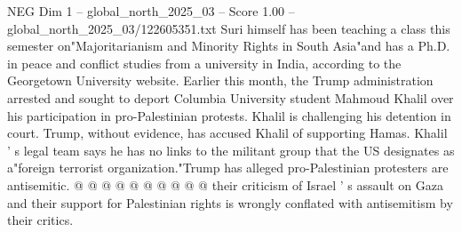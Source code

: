 \begin{textsample}{NEG Dim 1 – global\_north\_2025\_03 – Score 1.00 – global\_north\_2025\_03/122605351.txt}
Suri himself has been teaching a class this semester on"Majoritarianism and Minority Rights in South Asia"and has a Ph.D. in peace and conflict studies from a university in India, according to the Georgetown University website.
Earlier this month, the Trump administration arrested and sought to deport Columbia University student Mahmoud Khalil over his participation in pro-Palestinian protests.
Khalil is challenging his detention in court.
Trump, without evidence, has accused Khalil of supporting Hamas.
Khalil ' s legal team says he has no links to the militant group that the US designates as a"foreign terrorist organization."Trump has alleged pro-Palestinian protesters are antisemitic. @ @ @ @ @ @ @ @ @ @ their criticism of Israel ' s assault on Gaza and their support for Palestinian rights is wrongly conflated with antisemitism by their critics.

\end{textsample}
